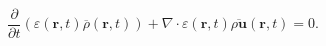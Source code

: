 \begin{equation}
\frac{\partial}{\partial t} \left(\varepsilon (\mathbf{r},t)
\overline{\rho}(\mathbf{r},t) \right)
+ \nabla \cdot \varepsilon (\mathbf{r},t) \overline{\rho
\mathbf{u}}(\mathbf{r},t)  = 0.
 \label{eq:continuity}
\end{equation}
